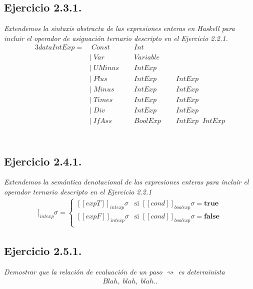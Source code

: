 \documentclass[a4paper,10pt]{article}
\begin{document}
\subsection*{Ejercicio 2.3.1.}
	\emph{Extendemos la sintaxis abstracta de las expresiones enteras en Haskell para incluir el operador de asignación ternario descripto en el Ejercicio 2.2.1.}
	\\
	\begin{alignat*}{3}
	data IntExp=&\;Const\;     &&Int\\
	    		&|\;Var\;      &&Variable\\
				&|\;UMinus\;\; &&IntExp\\
				&|\;Plus\;     &&IntExp\;     &&IntExp\\
				&|\;Minus\;    &&IntExp\;     &&IntExp\\
				&|\;Times\;    &&IntExp\;     &&IntExp\\
				&|\;Div\;      &&IntExp\;     &&IntExp\\
				&|\;IfAss\;    &&BoolExp\;\;  &&IntExp\;\; IntExp\\
	\end{alignat*}
\\
\subsection*{Ejercicio 2.4.1.}
	\emph{Extendemos la semántica denotacional de las expresiones enteras para incluir el operador ternario descripto en el Ejercicio 2.2.1}
	\\
	\begin{align*}
		[\![ cond\;?\; expT\;:\;expF ]\!]_{intexp}\sigma = 
		\begin{cases} 
			[\![expT]\!]_{intexp}\sigma &\mbox{si } [\![cond]\!]_{boolexp}\sigma = \textbf{true} \\
			[\![expF]\!]_{intexp}\sigma &\mbox{si } [\![cond]\!]_{boolexp}\sigma = \textbf{false} \\
		\end{cases}
	\end{align*}
\pagebreak
\subsection*{Ejercicio 2.5.1.}
	\emph{Demostrar que la relación de evaluación de un paso $\rightsquigarrow$ es determinista}
	\\
	\begin{align*}
		Blah,\;blah,\;blah..
	\end{align*}
\\
\end{document}

